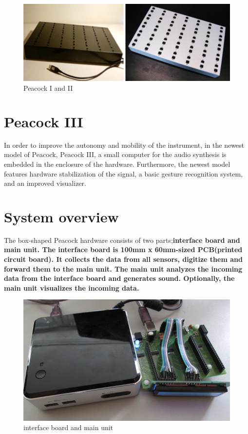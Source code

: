 \documentclass{nime-alternate}
\begin{document}
\begin{figure}[h]
       \centering
       \includegraphics[width=1\columnwidth]{peacocks}
       \caption{Peacock I and II}
       \label{fig:old_peacock}
\end{figure}

\section{Peacock III}

In order to improve the autonomy and mobility of the instrument, in the newest model of Peacock, Peacock III, a small computer for the audio synthesis is embedded in the enclosure of the hardware. Furthermore, the newest model features hardware stabilization of the signal, a basic gesture recognition system, and an improved visualizer. 

\section{System overview} %

The box-shaped Peacock hardware consists of two parts;\bf{interface board} and \bf{main unit}.
The interface board is 100mm x 60mm-sized PCB(printed circuit board). It collects the data from all sensors, digitize them and forward them to the main unit. The main unit analyzes the incoming data from the interface board and generates sound. Optionally, the main unit visualizes the incoming data.

\begin{figure}[htbp]
       \centering
              \includegraphics[width=1\columnwidth]{interface_main}
       \caption{interface board and main unit}
       \label{fig:interface_main}
\end{figure}
\end{document}
